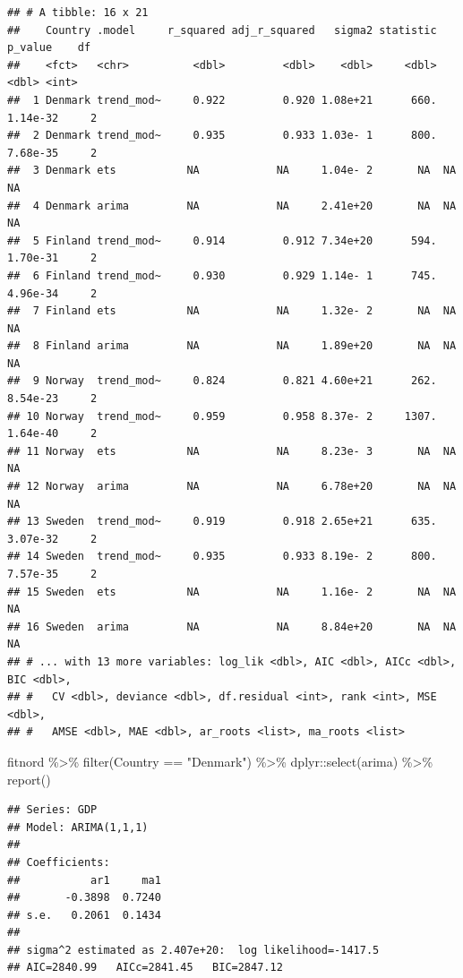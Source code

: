 \documentclass[
]{book}
\newenvironment{Shaded}{\begin{snugshade}}{\end{snugshade}}
\newcommand{\FunctionTok}[1]{\textcolor[rgb]{0.00,0.00,0.00}{#1}}
\newcommand{\NormalTok}[1]{#1}
\newcommand{\SpecialCharTok}[1]{\textcolor[rgb]{0.00,0.00,0.00}{#1}}
\newcommand{\StringTok}[1]{\textcolor[rgb]{0.31,0.60,0.02}{#1}}
\begin{document}
\begin{verbatim}
## # A tibble: 16 x 21
##    Country .model     r_squared adj_r_squared   sigma2 statistic   p_value    df
##    <fct>   <chr>          <dbl>         <dbl>    <dbl>     <dbl>     <dbl> <int>
##  1 Denmark trend_mod~     0.922         0.920 1.08e+21      660.  1.14e-32     2
##  2 Denmark trend_mod~     0.935         0.933 1.03e- 1      800.  7.68e-35     2
##  3 Denmark ets           NA            NA     1.04e- 2       NA  NA           NA
##  4 Denmark arima         NA            NA     2.41e+20       NA  NA           NA
##  5 Finland trend_mod~     0.914         0.912 7.34e+20      594.  1.70e-31     2
##  6 Finland trend_mod~     0.930         0.929 1.14e- 1      745.  4.96e-34     2
##  7 Finland ets           NA            NA     1.32e- 2       NA  NA           NA
##  8 Finland arima         NA            NA     1.89e+20       NA  NA           NA
##  9 Norway  trend_mod~     0.824         0.821 4.60e+21      262.  8.54e-23     2
## 10 Norway  trend_mod~     0.959         0.958 8.37e- 2     1307.  1.64e-40     2
## 11 Norway  ets           NA            NA     8.23e- 3       NA  NA           NA
## 12 Norway  arima         NA            NA     6.78e+20       NA  NA           NA
## 13 Sweden  trend_mod~     0.919         0.918 2.65e+21      635.  3.07e-32     2
## 14 Sweden  trend_mod~     0.935         0.933 8.19e- 2      800.  7.57e-35     2
## 15 Sweden  ets           NA            NA     1.16e- 2       NA  NA           NA
## 16 Sweden  arima         NA            NA     8.84e+20       NA  NA           NA
## # ... with 13 more variables: log_lik <dbl>, AIC <dbl>, AICc <dbl>, BIC <dbl>,
## #   CV <dbl>, deviance <dbl>, df.residual <int>, rank <int>, MSE <dbl>,
## #   AMSE <dbl>, MAE <dbl>, ar_roots <list>, ma_roots <list>
\end{verbatim}

\begin{Shaded}
\begin{Highlighting}[]
\NormalTok{fitnord }\SpecialCharTok{\%\textgreater{}\%} \FunctionTok{filter}\NormalTok{(Country }\SpecialCharTok{==} \StringTok{"Denmark"}\NormalTok{) }\SpecialCharTok{\%\textgreater{}\%}\NormalTok{ dplyr}\SpecialCharTok{::}\FunctionTok{select}\NormalTok{(arima) }\SpecialCharTok{\%\textgreater{}\%} \FunctionTok{report}\NormalTok{()}
\end{Highlighting}
\end{Shaded}

\begin{verbatim}
## Series: GDP 
## Model: ARIMA(1,1,1) 
## 
## Coefficients:
##           ar1     ma1
##       -0.3898  0.7240
## s.e.   0.2061  0.1434
## 
## sigma^2 estimated as 2.407e+20:  log likelihood=-1417.5
## AIC=2840.99   AICc=2841.45   BIC=2847.12
\end{verbatim}
\end{document}
